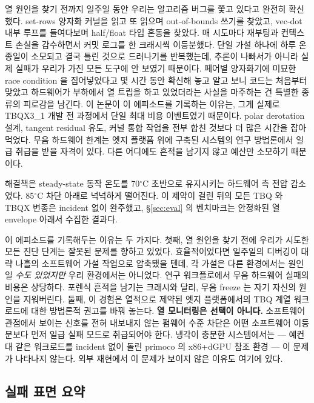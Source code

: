 \documentclass[10pt,twocolumn]{article}
\begin{document}
열 원인을 찾기 전까지 일주일 동안 우리는 알고리즘 버그를 쫓고 있다고 완전히 확신했다. set-rows 양자화 커널을 읽고 또 읽으며 out-of-bounds 쓰기를 찾았고, vec-dot 내부 루프를 들여다보며 half/float 타입 혼동을 찾았다. 매 시도마다 재부팅과 컨텍스트 손실을 감수하면서 커밋 로그를 한 크래시씩 이등분했다. 단일 가설 하나에 하루 온종일이 소모되고 결국 틀린 것으로 드러나기를 반복했는데, 추론이 나빠서가 아니라 실제 실패가 우리가 가진 모든 도구에 안 보였기 때문이다. 페어별 양자화기에 미묘한 race condition 을 집어넣었다고 몇 시간 동안 확신해 놓고 알고 보니 코드는 처음부터 맞았고 하드웨어가 부하에서 열 트립을 하고 있었더라는 사실을 마주하는 건 특별한 종류의 피로감을 남긴다. 이 논문이 이 에피소드를 기록하는 이유는, 그게 실제로 TBQX3\_1 개발 전 과정에서 단일 최대 비용 이벤트였기 때문이다. polar derotation 설계, tangent residual 유도, 커널 통합 작업을 전부 합친 것보다 더 많은 시간을 잡아먹었다. 무음 하드웨어 한계는 엣지 플랫폼 위에 구축된 시스템의 연구 방법론에서 일급 취급을 받을 자격이 있다. 다른 어디에도 흔적을 남기지 않고 예산만 소모하기 때문이다.

해결책은 steady-state 동작 온도를 70$^\circ$C 초반으로 유지시키는 하드웨어 측 전압 감소였다. 85$^\circ$C 차단 아래로 넉넉하게 떨어진다. 이 제약이 걸린 뒤의 모든 TBQ 와 TBQX 변종은 incident 없이 완주했고, \S\ref{sec:eval} 의 벤치마크는 안정화된 열 envelope 아래서 수집한 결과다.

이 에피소드를 기록해두는 이유는 두 가지다. 첫째, 열 원인을 찾기 전에 우리가 시도한 모든 진단 단계는 잘못된 문제를 향하고 있었다. 효율적이었다면 일주일의 디버깅이 대략 나흘의 소프트웨어 가설 작업으로 압축됐을 텐데, 각 가설은 다른 환경에서는 원인일 \emph{수도 있었지만} 우리 환경에서는 아니었다. 연구 워크플로에서 무음 하드웨어 실패의 비용은 상당하다. 포렌식 흔적을 남기는 크래시와 달리, 무음 freeze 는 자기 자신의 원인을 지워버린다. 둘째, 이 경험은 열적으로 제약된 엣지 플랫폼에서의 TBQ 계열 워크로드에 대한 방법론적 권고를 바꿔 놓는다. \textbf{열 모니터링은 선택이 아니다.} 소프트웨어 관점에서 보이는 신호를 전혀 내보내지 않는 펌웨어 수준 차단은 어떤 소프트웨어 이등분보다 먼저 일급 실패 모드로 취급되어야 한다. 냉각이 충분한 시스템에서는 --- 예컨대 같은 워크로드를 incident 없이 돌린 primoco 의 x86+dGPU 참조 환경 --- 이 문제가 나타나지 않는다. 외부 재현에서 이 문제가 보이지 않은 이유도 여기에 있다.

\subsection{실패 표면 요약}
\end{document}
